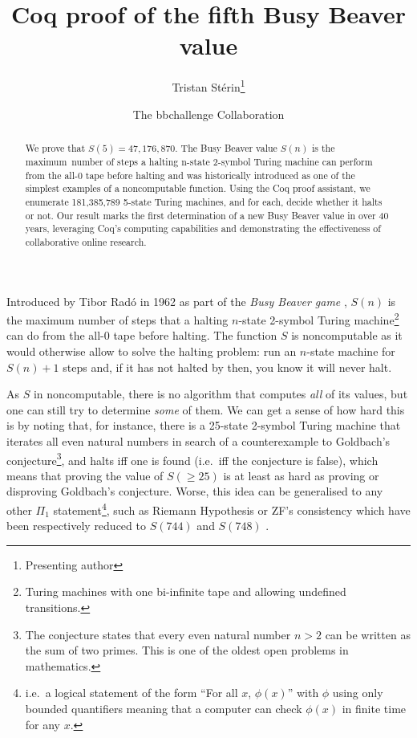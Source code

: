 \documentclass{easychair}
\title{
  \vspace{-1em}  
Coq proof of the fifth Busy Beaver value}
\author{
  Tristan Stérin\thanks{Presenting author}\inst{~1,2} \and The bbchallenge Collaboration\inst{1}
}
\institute{
  bbchallenge.org,
   \email{bbchallenge@bbchallenge.org}
\and
prgm.dev,
  Paris, France
  \email{tristan@prgm.dev}\\
 }
\newcommand{\radofull}{Tibor Rad\'o\xspace}
\theoremstyle{definition} %
\numberwithin{equation}{section}
\theoremstyle{definition} %
\begin{document}
\maketitle
\vspace{-1em}
\begin{abstract}
  We prove that $S(5) = 47,176,870$. The Busy Beaver value $S(n)$ is the maximum~number of steps a halting n-state 2-symbol Turing machine can perform from the all-0 tape before halting and was historically introduced as one of the simplest examples of a noncomputable function.  Using the Coq proof assistant, we enumerate 181,385,789 5-state Turing machines, and for each, decide whether it halts or not. 
  Our result marks the first determination of a new Busy Beaver value in over 40 years, leveraging Coq's computing capabilities and demonstrating the effectiveness of collaborative online research.
\end{abstract}
\newcommand{\ie}{i.e.~}
\newcommand{\eg}{e.g.~}

\newcommand{\noncomput}{noncomputable\xspace}
\newcommand{\BBfull}{Busy Beaver\xspace}
\newcommand{\Coq}{Coq\xspace}
\newcommand{\CoqProofReleaseURL}{\url{https://github.com/ccz181078/Coq-BB5}}


Introduced by \radofull in 1962 as part of the \textit{Busy Beaver game} \cite{Rado_1962}, $S(n)$ is the maximum number of steps that a halting $n$-state 2-symbol Turing machine\footnote{Turing machines with one bi-infinite tape and allowing undefined transitions.} can do from the all-0 tape before halting. The function $S$ is noncomputable as it would otherwise allow to solve the 
halting problem: run an $n$-state machine for $S(n)+1$ steps and, if it has not halted by then, you know it will never halt.

As $S$ in noncomputable, there is no algorithm that computes \textit{all} of its values, but one can still try to determine \textit{some} of them. We can get a sense of how hard this is by noting that, for instance, there is a 25-state 2-symbol Turing machine \cite{GoldbachTM27,GoldbachTM25} that iterates all even natural numbers in search of a counterexample to Goldbach's conjecture\footnote{The conjecture states that every even natural number $n>2$ can be written as the sum of two primes. This is one of the oldest open problems in mathematics.}, and halts iff one is found (\ie iff the conjecture is false), which means that proving the value of $S(\geq 25)$ is at least as hard as proving or disproving Goldbach's conjecture. Worse, this idea can be generalised to any other $\Pi_1$ statement\footnote{\ie a logical statement of the form ``For all $x$, $\phi(x)$'' with $\phi$ using only bounded quantifiers meaning that a computer can check $\phi(x)$ in finite time for any $x$.}, such as Riemann Hypothesis or ZF's consistency which have been respectively reduced to $S(744)$ and $S(748)$ \cite{RiemannTM,Yedidia2016,ZFTM,Yedidia2016,BusyBeaverFrontier,BB748Thesis}. 
\end{document}
